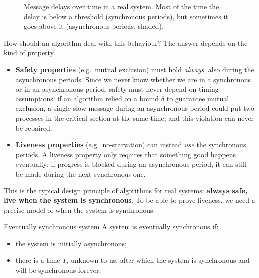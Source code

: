 \begin{figure}[H]
  \centering
  \caption{Message delays over time in a real system. Most of the time the delay is below a threshold (synchronous periods), but sometimes it goes above it (asynchronous periods, shaded).}
  \label{fig:partial-synchrony}
\end{figure}

How should an algorithm deal with this behaviour? The answer depends on the kind of property.
\begin{itemize}
  \item \textbf{Safety properties} (e.g.\ mutual exclusion) must hold \textit{always}, also during the asynchronous periods. Since we never know whether we are in a synchronous or in an asynchronous period, safety must never depend on timing assumptions: if an algorithm relied on a bound $\delta$ to guarantee mutual exclusion, a single slow message during an asynchronous period could put two processes in the critical section at the same time, and this violation can never be repaired.
  \item \textbf{Liveness properties} (e.g.\ no-starvation) can instead \textit{use} the synchronous periods. A liveness property only requires that something good happens eventually: if progress is blocked during an asynchronous period, it can still be made during the next synchronous one.
\end{itemize}

This is the typical design principle of algorithms for real systems: \textbf{always safe, live when the system is synchronous}. To be able to prove liveness, we need a precise model of when the system is synchronous.

\begin{frameddefn}[label={def:eventual-sync}]{Eventually synchronous system}
  A system is eventually synchronous if:
  \begin{itemize}
    \item the system is initially asynchronous;
    \item there is a time $T$, unknown to us, after which the system is synchronous and will be synchronous forever.
  \end{itemize}
\end{frameddefn}

